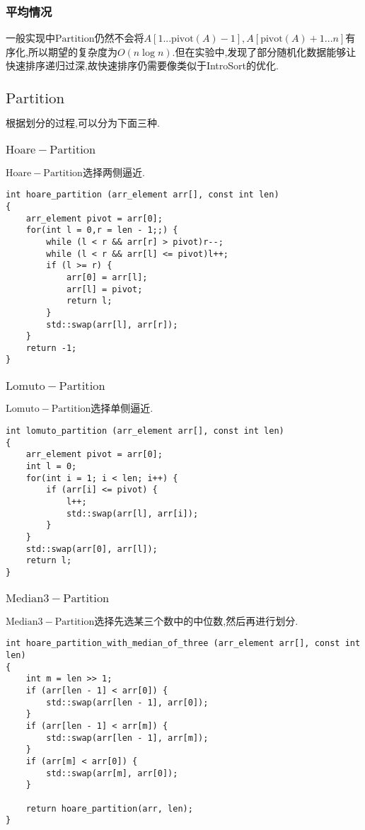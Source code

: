 \documentclass[UTF8]{ctexart}
\begin{document}
\subsubsection{平均情况}
一般实现中$\mathrm{Partition}$仍然不会将$A[1...\mathrm{pivot}(A)-1],A[\mathrm{pivot}(A)+1...n]$有序化,所以期望的复杂度为$O(n\log n)$.但在实验中,发现了部分随机化数据能够让快速排序递归过深,故快速排序仍需要像类似于IntroSort的优化.
\subsection{$\mathrm{Partition}$}
根据划分的过程,可以分为下面三种.
\subsubsection{$\mathrm{Hoare-Partition}$}
$\mathrm{Hoare-Partition}$选择两侧逼近.
{\firacode
\begin{lstlisting}[language={[ANSI]C++}]
int hoare_partition (arr_element arr[], const int len)
{
    arr_element pivot = arr[0];
    for(int l = 0,r = len - 1;;) {
        while (l < r && arr[r] > pivot)r--;
        while (l < r && arr[l] <= pivot)l++;
        if (l >= r) {
            arr[0] = arr[l];
            arr[l] = pivot;
            return l;
        }
        std::swap(arr[l], arr[r]);
    }
    return -1;
}
\end{lstlisting}
}
\subsubsection{$\mathrm{Lomuto-Partition}$}
$\mathrm{Lomuto-Partition}$选择单侧逼近.
{\firacode
\begin{lstlisting}[language={[ANSI]C++}]
int lomuto_partition (arr_element arr[], const int len)
{
    arr_element pivot = arr[0];
    int l = 0;
    for(int i = 1; i < len; i++) {
        if (arr[i] <= pivot) {
            l++;
            std::swap(arr[l], arr[i]);
        }
    }
    std::swap(arr[0], arr[l]);
    return l;
}
\end{lstlisting}
}
\subsubsection{$\mathrm{Median3-Partition}$}
$\mathrm{Median3-Partition}$选择先选某三个数中的中位数,然后再进行划分.
{\firacode
\begin{lstlisting}[language={[ANSI]C++}]
int hoare_partition_with_median_of_three (arr_element arr[], const int len)
{
    int m = len >> 1;
    if (arr[len - 1] < arr[0]) {
        std::swap(arr[len - 1], arr[0]);
    }
    if (arr[len - 1] < arr[m]) {
        std::swap(arr[len - 1], arr[m]);
    }
    if (arr[m] < arr[0]) {
        std::swap(arr[m], arr[0]);
    }

    return hoare_partition(arr, len);
}
\end{lstlisting}
}
\end{document}
